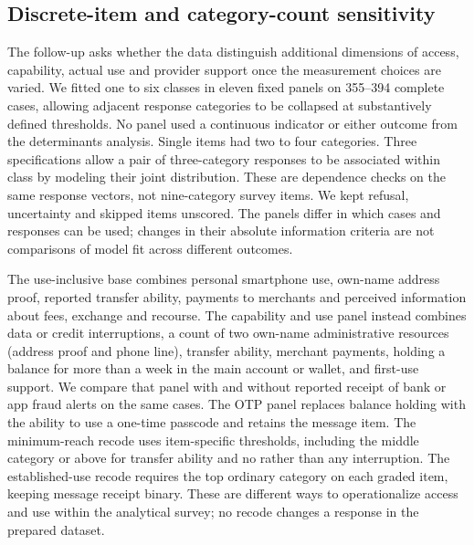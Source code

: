 \subsection{Discrete-item and category-count sensitivity}
\label{sec:discrete-lca-sensitivity}
The follow-up asks whether the data distinguish additional dimensions of access, capability, actual use and provider support once the measurement choices are varied. We fitted one to six classes in eleven fixed panels on 355--394 complete cases, allowing adjacent response categories to be collapsed at substantively defined thresholds. No panel used a continuous indicator or either outcome from the determinants analysis. Single items had two to four categories. Three specifications allow a pair of three-category responses to be associated within class by modeling their joint distribution. These are dependence checks on the same response vectors, not nine-category survey items. We kept refusal, uncertainty and skipped items unscored. The panels differ in which cases and responses can be used; changes in their absolute information criteria are not comparisons of model fit across different outcomes.

The use-inclusive base combines personal smartphone use, own-name address proof, reported transfer ability, payments to merchants and perceived information about fees, exchange and recourse. The capability and use panel instead combines data or credit interruptions, a count of two own-name administrative resources (address proof and phone line), transfer ability, merchant payments, holding a balance for more than a week in the main account or wallet, and first-use support. We compare that panel with and without reported receipt of bank or app fraud alerts on the same cases. The OTP panel replaces balance holding with the ability to use a one-time passcode and retains the message item. The minimum-reach recode uses item-specific thresholds, including the middle category or above for transfer ability and no rather than any interruption. The established-use recode requires the top ordinary category on each graded item, keeping message receipt binary. These are different ways to operationalize access and use within the analytical survey; no recode changes a response in the prepared dataset.

